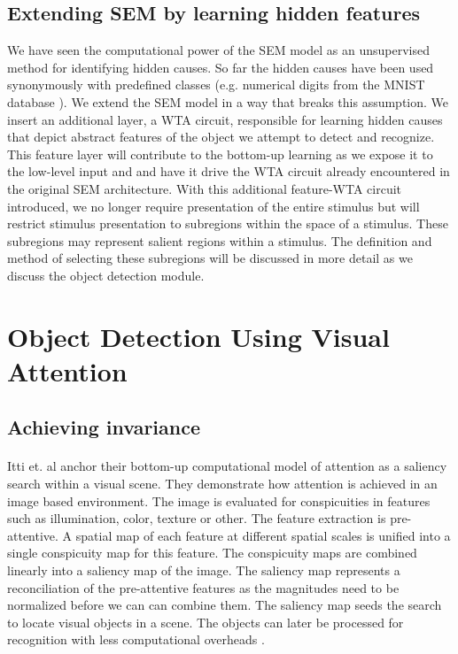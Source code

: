 \documentclass{report}
\begin{document}
\subsection{Extending SEM by learning hidden features}

We have seen the computational power of the SEM model as an unsupervised method for identifying hidden causes. So far the hidden causes have been used synonymously with predefined classes (e.g. numerical digits from the MNIST database \cite{LeCun1998}). We extend the SEM model in a way that breaks this assumption. We insert an additional layer, a WTA circuit, responsible for learning hidden causes that depict abstract features of the object we attempt to detect and recognize. This feature layer will contribute to the bottom-up learning as we expose it to the low-level input and and have it drive the WTA circuit already encountered in the original SEM architecture. With this additional feature-WTA circuit introduced, we no longer require presentation of the entire stimulus but will restrict stimulus presentation to subregions within the space of a stimulus. These subregions may represent salient regions within a stimulus. The definition and method of selecting these subregions will be discussed in more detail as we discuss the object detection module.

\section{Object Detection Using Visual Attention}

\subsection{Achieving invariance}

\paragraph{}Itti et. al anchor their bottom-up computational model of attention as a saliency search within a visual scene. They demonstrate how attention is achieved in an image based environment. The image is evaluated for conspicuities in features such as illumination, color, texture or other. The feature extraction is pre-attentive. A spatial map of each feature at different spatial scales is unified into a single conspicuity map for this feature. The conspicuity maps are combined linearly into a saliency map of the image. The saliency map represents a reconciliation of the pre-attentive features as the magnitudes need to be normalized before we can can combine them. The saliency map seeds the search to locate visual objects in a scene. The objects can later be processed for recognition with less computational overheads \cite{Itti2000, Itti2001}.
\end{document}
